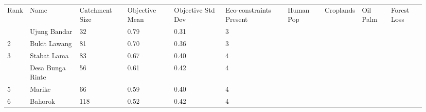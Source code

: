 \begin{table}[ht]
\centering
\begingroup\fontsize{8pt}{9pt}\selectfont
\begin{tabular}{C{0.03\textwidth}C{0.12\textwidth}C{0.09\textwidth}C{0.08\textwidth}C{0.08\textwidth}C{0.08\textwidth}C{0.07\textwidth}C{0.07\textwidth}C{0.07\textwidth}C{0.07\textwidth}}
 Rank & Name & Catchment Size & Objective Mean & Objective Std Dev & Eco-constraints  Present & Human Pop & Croplands & Oil Palm & Forest Loss \\ 
  & Ujung Bandar &  32 & \textcolor[HTML]{FFFFFF}{0.79} & \textcolor[HTML]{000000}{0.31} & \textcolor[HTML]{000000}{3} &  &  &  &  \\ 
  {2} & Bukit Lawang &  81 & \textcolor[HTML]{FFFFFF}{0.70} & \textcolor[HTML]{FFFFFF}{0.36} & \textcolor[HTML]{000000}{3} &  &  &  &  \\ 
  {3} & Stabat Lama &  83 & \textcolor[HTML]{FFFFFF}{0.67} & \textcolor[HTML]{FFFFFF}{0.40} & \textcolor[HTML]{FFFFFF}{4} &  &  &  &  \\ 
   & Desa Bunga Rinte &  56 & \textcolor[HTML]{FFFFFF}{0.61} & \textcolor[HTML]{FFFFFF}{0.42} & \textcolor[HTML]{FFFFFF}{4} &  &  &  &  \\ 
  {5} & Marike &  66 & \textcolor[HTML]{000000}{0.59} & \textcolor[HTML]{FFFFFF}{0.40} & \textcolor[HTML]{FFFFFF}{4} &  &  &  &  \\ 
  {6} & Bahorok & 118 & \textcolor[HTML]{000000}{0.52} & \textcolor[HTML]{FFFFFF}{0.42} & \textcolor[HTML]{FFFFFF}{4} &  &  &  &  \\ 

\end{tabular}
\end{table}
